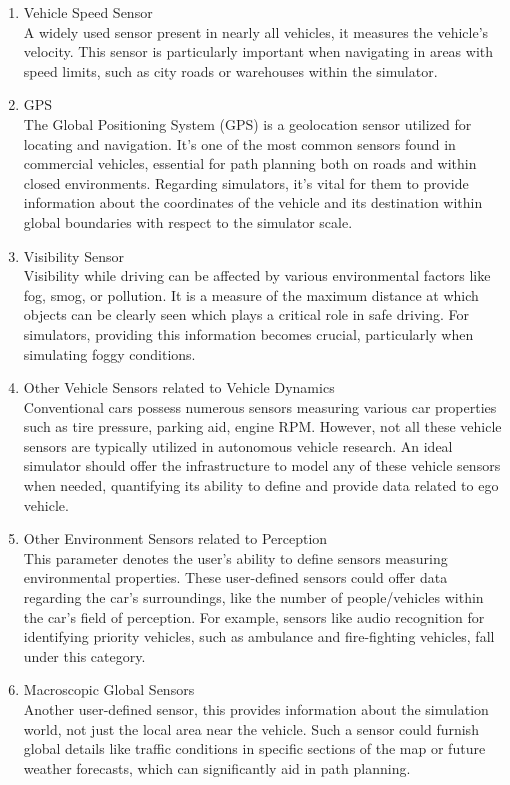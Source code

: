 \documentclass[12pt,twoside,a4paper,parskip]{scrbook} %
\begin{document}
\begin{enumerate}[label=\alph*.]
    \item Vehicle Speed Sensor\\
    A widely used sensor present in nearly all vehicles, it measures the vehicle's velocity. This sensor is particularly important when navigating in areas with speed limits, such as city roads or warehouses within the simulator.

    \item GPS \\
    The Global Positioning System (GPS) is a geolocation sensor utilized for locating and navigation. It's one of the most common sensors found in commercial vehicles, essential for path planning both on roads and within closed environments. Regarding simulators, it's vital for them to provide information about the coordinates of the vehicle and its destination within global boundaries with respect to the simulator scale.

    \item Visibility Sensor\\
    Visibility while driving can be affected by various environmental factors like fog, smog, or pollution. It is a measure of the maximum distance at which objects can be clearly seen which plays a critical role in safe driving. For simulators, providing this information becomes crucial, particularly when simulating foggy conditions. 

    \item Other Vehicle Sensors related to Vehicle Dynamics \\
    Conventional cars possess numerous sensors measuring various car properties such as tire pressure, parking aid, engine RPM. However, not all these vehicle sensors are typically utilized in autonomous vehicle research. An ideal simulator should offer the infrastructure to model any of these vehicle sensors when needed, quantifying its ability to define and provide data related to ego vehicle.
    
    \item Other Environment Sensors related to Perception \\
    This parameter denotes the user's ability to define sensors measuring environmental properties. These user-defined sensors could offer data regarding the car's surroundings, like the number of people/vehicles within the car's field of perception. For example, sensors like audio recognition for identifying priority vehicles, such as ambulance and fire-fighting vehicles, fall under this category.
    
    \item Macroscopic Global Sensors \\
    Another user-defined sensor, this provides information about the simulation world, not just the local area near the vehicle. Such a sensor could furnish global details like traffic conditions in specific sections of the map or future weather forecasts, which can significantly aid in path planning.    
\end{enumerate}
\end{document}
